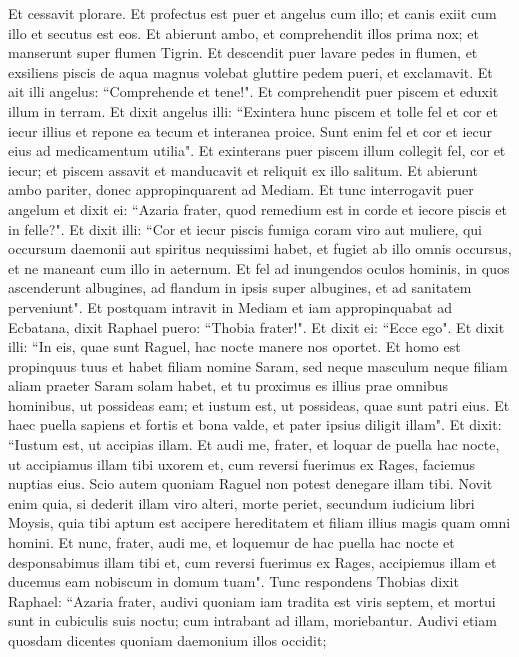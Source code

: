 \begin{biblechapter}  
\verse Et cessavit plorare. 
\verse Et profectus est puer et angelus cum illo; et canis exiit cum illo et secutus est eos. Et abierunt ambo, et comprehendit illos prima nox; et manserunt super flumen Tigrin. 
\verse Et descendit puer lavare pedes in flumen, et exsiliens piscis de aqua magnus volebat gluttire pedem pueri, et exclamavit. 
\verse Et ait illi angelus: “Comprehende et tene!". Et comprehendit puer piscem et eduxit illum in terram. 
\verse Et dixit angelus illi: “Exintera hunc piscem et tolle fel et cor et iecur illius et repone ea tecum et interanea proice. Sunt enim fel et cor et iecur eius ad medicamentum utilia".  
\verse Et exinterans puer piscem illum collegit fel, cor et iecur; et piscem assavit et manducavit et reliquit ex illo salitum. Et abierunt ambo pariter, donec appropinquarent ad Mediam. 
\verse Et tunc interrogavit puer angelum et dixit ei: “Azaria frater, quod remedium est in corde et iecore piscis et in felle?".  
\verse Et dixit illi: “Cor et iecur piscis fumiga coram viro aut muliere, qui occursum daemonii aut spiritus nequissimi habet, et fugiet ab illo omnis occursus, et ne maneant cum illo in aeternum. 
\verse Et fel ad inungendos oculos hominis, in quos ascenderunt albugines, ad flandum in ipsis super albugines, et ad sanitatem perveniunt". 
\verse Et postquam intravit in Mediam et iam appropinquabat ad Ecbatana, 
\verse dixit Raphael puero: “Thobia frater!". Et dixit ei: “Ecce ego". Et dixit illi: “In eis, quae sunt Raguel, hac nocte manere nos oportet. Et homo est propinquus tuus et habet filiam nomine Saram, 
\verse sed neque masculum neque filiam aliam praeter Saram solam habet, et tu proximus es illius prae omnibus hominibus, ut possideas eam; et iustum est, ut possideas, quae sunt patri eius. Et haec puella sapiens et fortis et bona valde, et pater ipsius diligit illam".  
\verse Et dixit: “Iustum est, ut accipias illam. Et audi me, frater, et loquar de puella hac nocte, ut accipiamus illam tibi uxorem et, cum reversi fuerimus ex Rages, faciemus nuptias eius. Scio autem quoniam Raguel non potest denegare illam tibi. Novit enim quia, si dederit illam viro alteri, morte periet, secundum iudicium libri Moysis, quia tibi aptum est accipere hereditatem et filiam illius magis quam omni homini. Et nunc, frater, audi me, et loquemur de hac puella hac nocte et desponsabimus illam tibi et, cum reversi fuerimus ex Rages, accipiemus illam et ducemus eam nobiscum in domum tuam". 
\verse Tunc respondens Thobias dixit Raphael: “Azaria frater, audivi quoniam iam tradita est viris septem, et mortui sunt in cubiculis suis noctu; cum intrabant ad illam, moriebantur. Audivi etiam quosdam dicentes quoniam daemonium illos occidit; 

\end{biblechapter}
